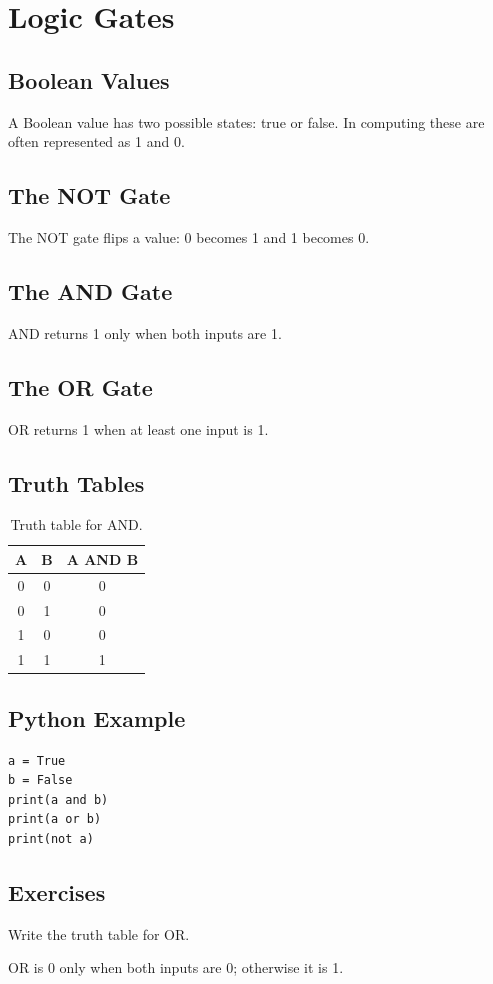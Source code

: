\chapter{Logic Gates}
\label{chap:logic-gates}
\section{Boolean Values}A Boolean value has two possible states: true or false. In computing these are often represented as 1 and 0.
\section{The NOT Gate}The NOT gate flips a value: 0 becomes 1 and 1 becomes 0.
\section{The AND Gate}AND returns 1 only when both inputs are 1.
\section{The OR Gate}OR returns 1 when at least one input is 1.
\section{Truth Tables}\begin{table}[H]\centering\begin{tabular}{ccc}\toprule A&B&A AND B\\\midrule 0&0&0\\0&1&0\\1&0&0\\1&1&1\\\bottomrule\end{tabular}\caption{Truth table for AND.}\end{table}
\section{Python Example}\begin{lstlisting}
a = True
b = False
print(a and b)
print(a or b)
print(not a)
\end{lstlisting}
\section{Exercises}\begin{exercise}Write the truth table for OR.\end{exercise}\begin{solution}OR is 0 only when both inputs are 0; otherwise it is 1.\end{solution}
